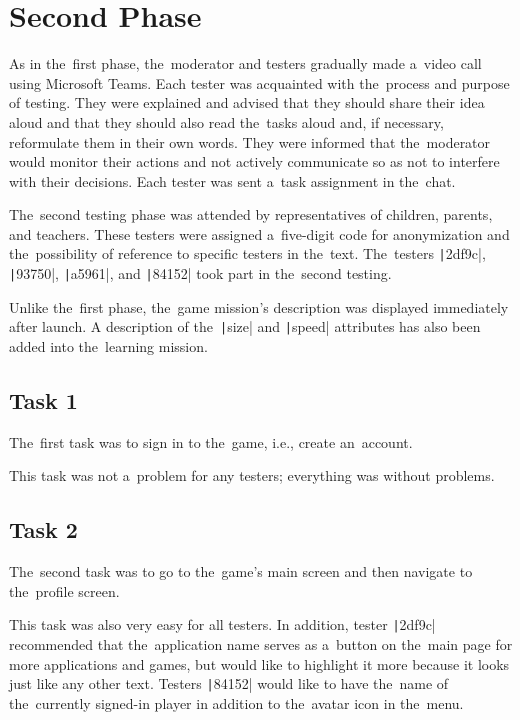 \section{Second Phase}

As in the~first phase, the~moderator and testers gradually made a~video call using Microsoft Teams.
Each tester was acquainted with the~process and purpose of testing.
They were explained and advised that they should share their idea aloud and that they should also read the~tasks aloud and, if necessary, reformulate them in their own words.
They were informed that the~moderator would monitor their actions and not actively communicate so as not to interfere with their decisions.
Each tester was sent a~task assignment in the~chat.

The~second testing phase was attended by representatives of children, parents, and teachers.
These testers were assigned a~five-digit code for anonymization and the~possibility of reference to specific testers in the~text.
The~testers \texttt|2df9c|, \texttt|93750|, \texttt|a5961|, and \texttt|84152| took part in the~second testing.

Unlike the~first phase, the~game mission's description was displayed immediately after launch.
A description of the~\texttt|size| and \texttt|speed| attributes has also been added into the~learning mission.

\subsection*{Task 1}

The~first task was to sign in to the~game, i.e., create an~account.

This task was not a~problem for any testers; everything was without problems.

\subsection*{Task 2}

The~second task was to go to the~game's main screen and then navigate to the~profile screen.

This task was also very easy for all testers.
In addition, tester \texttt|2df9c| recommended that the~application name serves as a~button on the~main page for more applications and games, but would like to highlight it more because it looks just like any other text.
Testers \texttt|84152| would like to have the~name of the~currently signed-in player in addition to the~avatar icon in the~menu.

